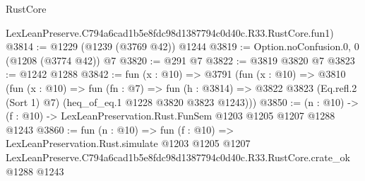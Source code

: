 \begin{lexlean}{RustCore}
\begin{coremodule}
    LexLeanPreserve.C794a6cad1b5e8fdc98d1387794c0d40c.R33.RustCore.fun1)
@3814 := @1229 (@1239 (@3769 @42)) @1244
@3819 := Option.noConfusion.{0, 0} (@1208 (@3774 @42)) @7
@3820 := @291 @7
@3822 := @3819 @3820 @7
@3823 := @1242 @1288
@3842 := fun (x : @10) =>
  @3791
    (fun (x : @10) =>
    @3810
      (fun (x : @10) =>
      fun (fn : @7) =>
      fun (h : @3814) =>
      @3822 @3823 (Eq.refl.{2} (Sort 1) @7) (heq_of_eq.{1} @1228 @3820 @3823 @1243)))
@3850 := (n : @10) -> (f : @10) -> LexLeanPreservation.Rust.FunSem @1203 @1205 @1207 @1288 @1243
@3860 := fun (n : @10) =>
  fun (f : @10) =>
  LexLeanPreservation.Rust.simulate
    @1203
    @1205
    @1207
    LexLeanPreserve.C794a6cad1b5e8fdc98d1387794c0d40c.R33.RustCore.crate_ok
    @1288
    @1243
\end{coremodule}
\end{lexlean}
